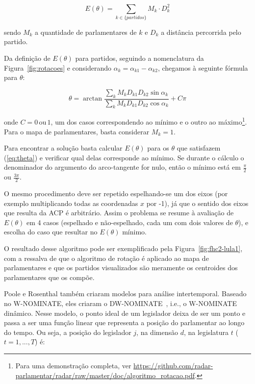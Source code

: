 \documentclass[
	article,			%
	12pt,				%
	oneside,			%
	a4paper,			%
	english,			%
	brazil,				%
	sumario=tradicional,
	oldfontcommands %
	]{abntex2}
\newcommand\wnominate{W-NOMINATE\xspace}
\begin{document}
\begin{equation}
E(\theta)=\sum_{k\in\{partidos\}}M_{k}\cdot D_{k}^{2}
\label{eq:e_theta_partidos}
\end{equation}

sendo $M_{k}$ a quantidade de parlamentares de $k$ e $D_{k}$ a distância percorrida pelo partido.


Da definição de $E(\theta)$ para partidos, seguindo a nomenclatura da Figura~\ref{fig:rotacoes} e considerando $\alpha_k = \alpha_{k1} - \alpha_{k2}$, chegamos à seguinte fórmula para $\theta$:

\begin{equation}
\theta=\arctan\frac{\sum_{k}M_{k}D_{k1}D_{k2}\sin\alpha_{k}}{\sum_{k}M_{k}D_{k1}D_{k2}\cos\alpha_{k}}+C\pi
\label{eq:theta}
\end{equation}

onde $C=0\mathrm{\, ou}\,1$, um dos casos correspondendo ao mínimo e o outro ao máximo\footnote{Para uma demonstração completa, ver \url{https://github.com/radar-parlamentar/radar/raw/master/doc/algoritmo_rotacao.pdf}.}. Para o mapa de parlamentares, basta considerar $M_{k} = 1$.

Para encontrar a solução basta calcular $E(\theta)$ para os $\theta$ que satisfazem (\ref{eq:theta}) e verificar qual delas corresponde ao mínimo. Se durante o cálculo o denominador do argumento do arco-tangente for nulo, então o mínimo está em $\frac{\pi}{2}$ ou $\frac{3\pi}{2}$.

O mesmo procedimento deve ser repetido espelhando-se um dos eixos (por exemplo multiplicando todas as coordenadas $x$ por -1), já que o sentido dos eixos que resulta da ACP é arbitrário. Assim o problema se resume à avaliação de $E(\theta)$ em 4 casos (espelhado e não-espelhado, cada um com dois valores de $\theta$), e escolha do caso que resultar no $E(\theta)$ mínimo.

O resultado desse algoritmo pode ser exemplificado pela Figura~\ref{fig:fhc2-lula1}, com a ressalva de que o algoritmo de rotação é aplicado ao mapa de parlamentares e que os partidos visualizados são meramente os centroides dos parlamentares que os compõe.

Poole e Rosenthal também criaram modelos para análise intertemporal. Baseado no \wnominate, eles criaram o DW-NOMINATE~\cite{poole2001dnomiante}, i.e., o \wnominate dinâmico. Nesse modelo, o ponto ideal de um legislador deixa de ser um ponto e passa a ser uma função linear que representa a posição do parlamentar ao longo do tempo. Ou seja, a posição do legislador $j$, na dimensão $d$, na legislatura $t$ ($t=1,...,T$) é:
\end{document}
